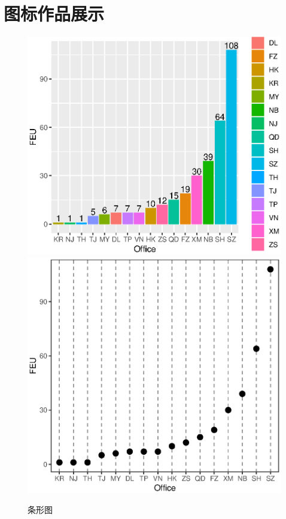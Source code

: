 \chapter{图标作品展示}
\begin{figure}[h]
	\begin{center}
		\caption{条形图}
		\includegraphics[scale=0.45]{eps/Rplot01}
		\qquad
		\includegraphics[scale=0.46]{eps/Rplot13}
		\end{center}
		\end{figure}
